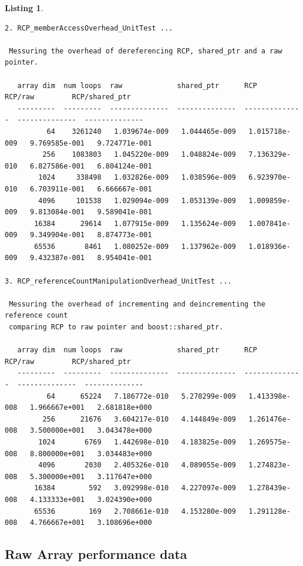 \documentclass[pdf,ps2pdf,11pt]{SANDreport}
\newtheorem{listing}{Listing}
\begin{document}
\begin{listing}
{\begin{verbatim}
2. RCP_memberAccessOverhead_UnitTest ... 
 
 Messuring the overhead of dereferencing RCP, shared_ptr and a raw pointer.
 
   array dim  num loops  raw             shared_ptr      RCP             RCP/raw         RCP/shared_ptr
   ---------  ---------  --------------  --------------  --------------  --------------  --------------
          64    3261240   1.039674e-009   1.044465e-009   1.015718e-009   9.769585e-001   9.724771e-001
         256    1083803   1.045220e-009   1.048824e-009   7.136329e-010   6.827586e-001   6.804124e-001
        1024     338498   1.032826e-009   1.038596e-009   6.923970e-010   6.703911e-001   6.666667e-001
        4096     101538   1.029094e-009   1.053139e-009   1.009859e-009   9.813084e-001   9.589041e-001
       16384      29614   1.077915e-009   1.135624e-009   1.007841e-009   9.349904e-001   8.874773e-001
       65536       8461   1.080252e-009   1.137962e-009   1.018936e-009   9.432387e-001   8.954041e-001

3. RCP_referenceCountManipulationOverhead_UnitTest ... 
 
 Messuring the overhead of incrementing and deincrementing the reference count
 comparing RCP to raw pointer and boost::shared_ptr.
 
   array dim  num loops  raw             shared_ptr      RCP             RCP/raw         RCP/shared_ptr
   ---------  ---------  --------------  --------------  --------------  --------------  --------------
          64      65224   7.186772e-010   5.270299e-009   1.413398e-008   1.966667e+001   2.681818e+000
         256      21676   3.604217e-010   4.144849e-009   1.261476e-008   3.500000e+001   3.043478e+000
        1024       6769   1.442698e-010   4.183825e-009   1.269575e-008   8.800000e+001   3.034483e+000
        4096       2030   2.405326e-010   4.089055e-009   1.274823e-008   5.300000e+001   3.117647e+000
       16384        592   3.092998e-010   4.227097e-009   1.278439e-008   4.133333e+001   3.024390e+000
       65536        169   2.708661e-010   4.153280e-009   1.291128e-008   4.766667e+001   3.108696e+000
\end{verbatim}}
\end{listing}

\pagebreak

%
{}\subsection{Raw Array performance data}
\label{apdx:raw-array-perf-data}
%
\end{document}
